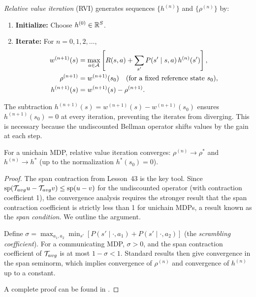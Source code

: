 \documentclass[11pt,a4paper]{article}
\begin{document}
\begin{definition}
\label{def:rvi}
\emph{Relative value iteration} (RVI) generates sequences
$\{h^{(n)}\}$ and $\{\rho^{(n)}\}$ by:
\begin{enumerate}[nosep]
    \item \textbf{Initialize:} Choose $h^{(0)} \in \mathbb{R}^S$.
    \item \textbf{Iterate:} For $n = 0, 1, 2, \ldots$,
    \begin{align*}
        w^{(n+1)}(s) &= \max_{a \in \mathcal{A}}
        \left[ R(s,a) + \sum_{s'} P(s' \mid s,a)\, h^{(n)}(s')
        \right], \\
        \rho^{(n+1)} &= w^{(n+1)}(s_0) \quad
        \text{(for a fixed reference state } s_0\text{)}, \\
        h^{(n+1)}(s) &= w^{(n+1)}(s) - \rho^{(n+1)}.
    \end{align*}
\end{enumerate}
\end{definition}

\begin{remark}
\label{rem:rvi-centering}
The subtraction $h^{(n+1)}(s) = w^{(n+1)}(s) - w^{(n+1)}(s_0)$
ensures $h^{(n+1)}(s_0) = 0$ at every iteration, preventing the
iterates from diverging. This is necessary because the undiscounted
Bellman operator shifts values by the gain at each step.
\end{remark}

\begin{theorem}
\label{thm:rvi-convergence}
For a unichain MDP, relative value iteration converges:
$\rho^{(n)} \to \rho^*$ and $h^{(n)} \to h^*$ (up to the
normalization $h^*(s_0) = 0$).
\end{theorem}

\begin{proof}
The span contraction from Lesson~43 is the key tool. Since
$\mathrm{sp}(\mathcal{T}_{avg} u - \mathcal{T}_{avg} v) \leq
\mathrm{sp}(u - v)$ for the undiscounted operator (with contraction
coefficient 1), the convergence analysis requires the stronger
result that the span contraction coefficient is strictly less than 1
for unichain MDPs, a result known as the
\emph{span condition}. We outline the argument.

Define $\sigma = \max_{a_1, a_2} \min_{s'} [P(s' \mid \cdot, a_1)
+ P(s' \mid \cdot, a_2)]$ (the \emph{scrambling coefficient}). For
a communicating MDP, $\sigma > 0$, and the span contraction
coefficient of $\mathcal{T}_{avg}$ is at most $1 - \sigma < 1$.
Standard results then give convergence in the span seminorm, which
implies convergence of $\rho^{(n)}$ and convergence of $h^{(n)}$ up
to a constant.

A complete proof can be found in \citet[Chapter 8]{puterman2014}.
\end{proof}
\end{document}
